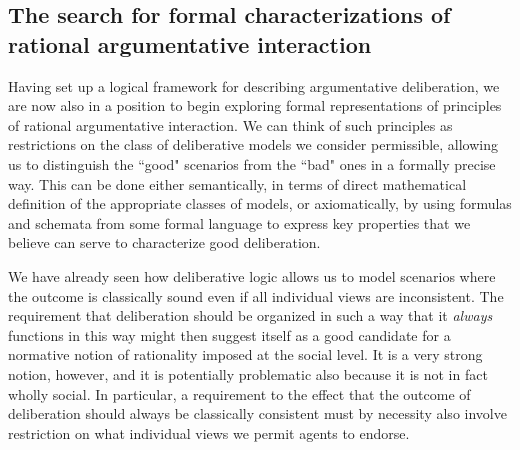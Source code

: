 \documentclass[greybox]{svmult}
\begin{document}
\subsection{The search for formal characterizations of rational argumentative interaction}\label{sub:for}

Having set up a logical framework for describing argumentative deliberation, we are now also in a position to begin exploring formal representations of principles of rational argumentative interaction. We can think of such principles as restrictions on the class of deliberative models we consider permissible, allowing us to distinguish the ``good" scenarios from the ``bad" ones in a formally precise way. This can be done either semantically, in terms of direct mathematical definition of the appropriate classes of models, or axiomatically, by using formulas and schemata from some formal language to express key properties that we believe can serve to characterize good deliberation.

We have already seen how deliberative logic allows us to model scenarios where the outcome is classically sound even if all individual views are inconsistent. The requirement that deliberation should be organized in such a way that it \emph{always} functions in this way might then suggest itself as a good candidate for a normative notion of rationality imposed at the social level. It is a very strong notion, however, and it is potentially problematic also because it is not in fact wholly social. In particular, a requirement to the effect that the outcome of deliberation should always be classically consistent must by necessity also involve restriction on what individual views we permit agents to endorse. 
\end{document}
